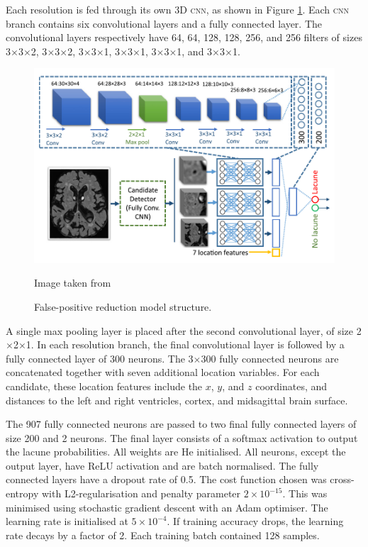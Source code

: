 Each resolution is fed through its own 3D \textsc{cnn}, as shown in Figure \ref{litrev-ghafoorian_model2fig}. Each \textsc{cnn} branch contains six convolutional layers and a fully connected layer. The convolutional layers respectively have 64, 64, 128, 128, 256, and 256 filters of sizes 3$\times$3$\times$2, 3$\times$3$\times$2, 3$\times$3$\times$1, 3$\times$3$\times$1, 3$\times$3$\times$1, and 3$\times$3$\times$1.

\begin{figure}[ht]
	\centering
	\includegraphics[width=\textwidth]{Images/5_ghafoorian_model2.png}
	\caption{\small{False-positive reduction model structure.}}
	\small Image taken from \cite{GhafoorianM.2017Dml3}
	\label{litrev-ghafoorian_model2fig}
\end{figure}

A single max pooling layer is placed after the second convolutional layer, of size 2$\times$2$\times$1. In each resolution branch, the final convolutional layer is followed by a fully connected layer of 300 neurons. The 3$\times$300 fully connected neurons are concatenated together with seven additional location variables. For each candidate, these location features include the $x$, $y$, and $z$ coordinates, and distances to the left and right ventricles, cortex, and midsagittal brain surface.

The 907 fully connected neurons are passed to two final fully connected layers of size 200 and 2 neurons. The final layer consists of a softmax activation to output the lacune probabilities. All weights are He initialised. All neurons, except the output layer, have ReLU activation and are batch normalised. The fully connected layers have a dropout rate of 0.5. The cost function chosen was cross-entropy with L2-regularisation and penalty parameter $2\times10^{-15}$. This was minimised using stochastic gradient descent with an Adam optimiser. The learning rate is initialised at $5\times10^{-4}$. If training accuracy drops, the learning rate decays by a factor of 2. Each training batch contained 128 samples.

